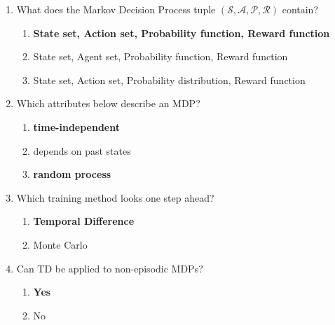 \documentclass{report}
\numberwithin{equation}{section}
\begin{document}
\begin{enumerate}
    \item What does the Markov Decision Process tuple \((\mathcal{S}, \mathcal{A}, \mathcal{P}, \mathcal{R})\) contain?
    \begin{enumerate}[label=\alph*.]
        \item \textbf{State set, Action set, Probability function, Reward function}
        \item State set, Agent set, Probability function, Reward function
        \item State set, Action set, Probability distribution, Reward function
    \end{enumerate}
    \item Which attributes below describe an MDP?
    \begin{enumerate}[label=\alph*.]
        \item \textbf{time-independent}
        \item depends on past states
        \item \textbf{random process}
    \end{enumerate}
    \item Which training method looks one step ahead?
    \begin{enumerate}[label=\alph*.]
        \item \textbf{Temporal Difference}
        \item Monte Carlo
    \end{enumerate}
    \item Can TD be applied to non-episodic MDPs?
    \begin{enumerate}[label=\alph*.]
        \item \textbf{Yes}
        \item No
    \end{enumerate}

\end{enumerate}
\end{document}
